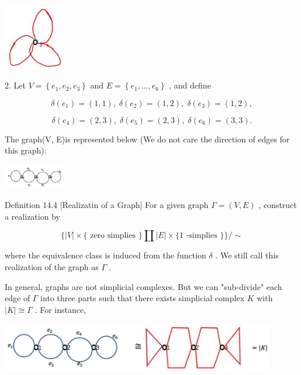\begin{center}
\includegraphics[max width=0.2\textwidth]{images/bo_d2bcsrref24c73avs720_143_735_1203_196_213_0.jpg}
\end{center}
\hspace*{3em} 

2. Let \(V = \left\{  {{e}_{1},{e}_{2},{e}_{3}}\right\}\) and \(E = \left\{  {{e}_{1},\ldots ,{e}_{6}}\right\}\) , and define

\[
\delta \left( {e}_{1}\right)  = \left( {1,1}\right) ,\;\delta \left( {e}_{2}\right)  = \left( {1,2}\right) ,\;\delta \left( {e}_{3}\right)  = \left( {1,2}\right) ,
\]

\[
\delta \left( {e}_{4}\right)  = \left( {2,3}\right) ,\;\delta \left( {e}_{5}\right)  = \left( {2,3}\right) ,\;\delta \left( {e}_{6}\right)  = \left( {3,3}\right) .
\]

The graph(V, E)is represented below (We do not care the direction of edges for this graph):

\begin{center}
\includegraphics[max width=0.2\textwidth]{images/bo_d2bcsrref24c73avs720_143_688_1907_300_121_0.jpg}
\end{center}
\hspace*{3em} 

Definition 14.4 [Realizatin of a Graph] For a given graph \(\Gamma  = \left( {V,E}\right)\) , construct a realization by

\[
\{ \left| V\right|  \times  \{ \text{ zero simplies }\} \coprod \left| E\right|  \times  \{ 1\text{ -simplies }\} \} / \sim
\]

where the equivalence class is induced from the function \(\delta\) . We still call this realization of the graph as \(\Gamma\) .

In general, graphs are not simplicial complexes. But we can "sub-divide" each edge of \(\Gamma\) into three parts such that there exists simplicial complex \(K\) with \(\left| K\right|  \cong  \Gamma\) . For instance,

\begin{center}
\includegraphics[max width=0.9\textwidth]{images/bo_d2bcsrref24c73avs720_144_387_976_1147_203_0.jpg}
\end{center}
\hspace*{3em} 

